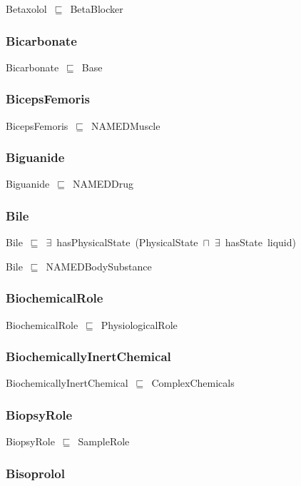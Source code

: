\documentclass{article}
\begin{document}
Betaxolol~\ensuremath{\sqsubseteq}~BetaBlocker~

\subsubsection*{Bicarbonate}

Bicarbonate~\ensuremath{\sqsubseteq}~Base~

\subsubsection*{BicepsFemoris}

BicepsFemoris~\ensuremath{\sqsubseteq}~NAMEDMuscle~

\subsubsection*{Biguanide}

Biguanide~\ensuremath{\sqsubseteq}~NAMEDDrug~

\subsubsection*{Bile}

Bile~\ensuremath{\sqsubseteq}~\ensuremath{\exists}~hasPhysicalState~(PhysicalState~\ensuremath{\sqcap}~\ensuremath{\exists}~hasState~liquid)~

Bile~\ensuremath{\sqsubseteq}~NAMEDBodySubstance~

\subsubsection*{BiochemicalRole}

BiochemicalRole~\ensuremath{\sqsubseteq}~PhysiologicalRole~

\subsubsection*{BiochemicallyInertChemical}

BiochemicallyInertChemical~\ensuremath{\sqsubseteq}~ComplexChemicals~

\subsubsection*{BiopsyRole}

BiopsyRole~\ensuremath{\sqsubseteq}~SampleRole~

\subsubsection*{Bisoprolol}
\end{document}
